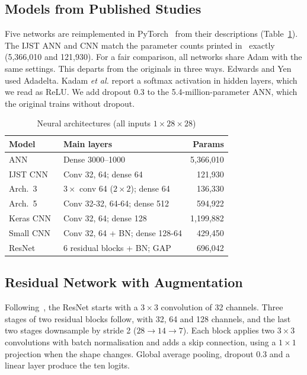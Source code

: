 \documentclass[conference]{IEEEtran}
\begin{document}
\subsection{Models from Published Studies}
Five networks are reimplemented in PyTorch~\cite{paszke2019pytorch} from their descriptions (Table~\ref{tab:arch}). The IJST ANN and CNN match the parameter counts printed in~\cite{sumera2022cnn} exactly (5,366,010 and 121,930). For a fair comparison, all networks share Adam with the same settings. This departs from the originals in three ways. Edwards and Yen used Adadelta. Kadam \textit{et al.} report a softmax activation in hidden layers, which we read as ReLU. We add dropout 0.3 to the 5.4-million-parameter ANN, which the original trains without dropout.

\begin{table}[t]
\caption{Neural architectures (all inputs $1\times28\times28$)}
\label{tab:arch}
\centering
\small
\setlength{\tabcolsep}{4pt}
\begin{tabular}{@{}llr@{}}
\toprule
Model & Main layers & Params \\
\midrule
ANN~\cite{sumera2022cnn} & Dense 3000--1000 & 5,366,010 \\
IJST CNN~\cite{sumera2022cnn} & Conv 32, 64; dense 64 & 121,930 \\
Arch.~3~\cite{kadam2020cnn} & $3\times$ conv 64 ($2\times2$); dense 64 & 136,330 \\
Arch.~5~\cite{kadam2020cnn} & Conv 32-32, 64-64; dense 512 & 594,922 \\
Keras CNN~\cite{edwards2019fashion} & Conv 32, 64; dense 128 & 1,199,882 \\
Small CNN & Conv 32, 64 + BN; dense 128-64 & 429,450 \\
ResNet & 6 residual blocks + BN; GAP & 696,042 \\
\bottomrule
\end{tabular}
\end{table}

\subsection{Residual Network with Augmentation}
Following~\cite{bhatnagar2017classification,he2016deep}, the ResNet starts with a $3\times3$ convolution of 32 channels. Three stages of two residual blocks follow, with 32, 64 and 128 channels, and the last two stages downsample by stride 2 ($28\to14\to7$). Each block applies two $3\times3$ convolutions with batch normalisation and adds a skip connection, using a $1\times1$ projection when the shape changes. Global average pooling, dropout 0.3 and a linear layer produce the ten logits.
\end{document}
